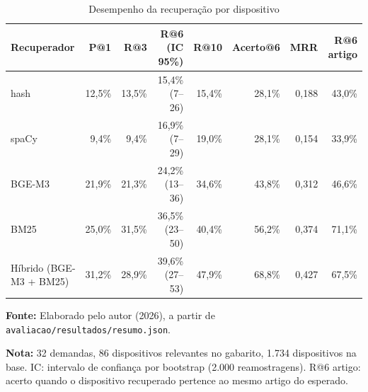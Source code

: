\begin{table}[htbp]
\caption{Desempenho da recuperação por dispositivo}\label{tab:recuperacao}
\centering\footnotesize
\setlength{\tabcolsep}{4pt}
\begin{tabular}{lrrrrrrr}
\toprule
Recuperador & P@1 & R@3 & R@6 (IC 95\%) & R@10 & Acerto@6 & MRR & R@6 artigo \\
\midrule
hash & 12,5\% & 13,5\% & 15,4\% (7--26) & 15,4\% & 28,1\% & 0,188 & 43,0\% \\
spaCy & 9,4\% & 9,4\% & 16,9\% (7--29) & 19,0\% & 28,1\% & 0,154 & 33,9\% \\
BGE-M3 & 21,9\% & 21,3\% & 24,2\% (13--36) & 34,6\% & 43,8\% & 0,312 & 46,6\% \\
BM25 & 25,0\% & 31,5\% & 36,5\% (23--50) & 40,4\% & 56,2\% & 0,374 & 71,1\% \\
Híbrido (BGE-M3 + BM25) & 31,2\% & 28,9\% & 39,6\% (27--53) & 47,9\% & 68,8\% & 0,427 & 67,5\% \\
\bottomrule
\end{tabular}
\par\smallskip
\begin{minipage}{\linewidth}{\small \textbf{Fonte:} Elaborado pelo autor (2026), a partir de \texttt{avaliacao/resultados/resumo.json}.}\par
{\small \textbf{Nota:} 32 demandas, 86 dispositivos relevantes no gabarito, 1.734 dispositivos na base. IC: intervalo de confiança por bootstrap (2.000 reamostragens). R@6 artigo: acerto quando o dispositivo recuperado pertence ao mesmo artigo do esperado.}\end{minipage}
\end{table}
